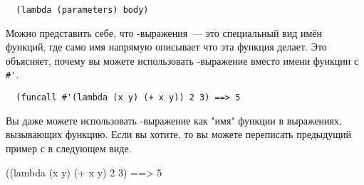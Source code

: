 \begin{lstlisting}
  (lambda (parameters) body)
\end{lstlisting}

Можно представить себе, что -выражения~--- это специальный вид имён функций,
где само имя напрямую описывает что эта функция делает.  Это объясняет, почему вы можете
использовать -выражение вместо имени функции с \lstinline!#'!.

\begin{verbatim}
  (funcall #'(lambda (x y) (+ x y)) 2 3) ==> 5
\end{verbatim}

Вы даже можете использовать -выражение как "имя" функции в выражениях,
вызывающих функцию.  Если вы хотите, то вы можете переписать предыдущий пример с
 в следующем виде.

  ((lambda (x y) (+ x y) 2 3) ==> 5

